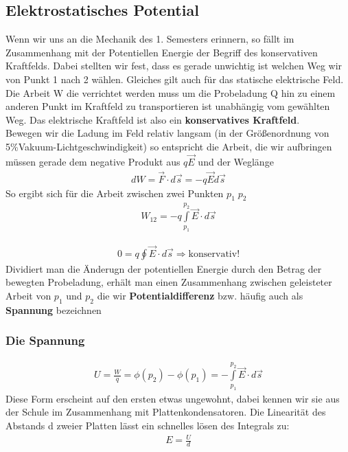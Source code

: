 \subsection{Elektrostatisches Potential} Wenn wir uns an die Mechanik des 1. Semesters erinnern, so fällt im Zusammenhang mit der Potentiellen Energie der Begriff des konservativen Kraftfelds. Dabei stellten wir fest, dass es gerade unwichtig ist welchen Weg wir von Punkt 1 nach 2 wählen. Gleiches gilt auch für das statische elektrische Feld. Die Arbeit W die verrichtet werden muss um die Probeladung Q hin zu einem anderen Punkt im Kraftfeld zu transportieren ist unabhängig vom gewählten Weg. Das elektrische Kraftfeld ist also ein \textbf{konservatives Kraftfeld}. \\ Bewegen wir die Ladung im Feld relativ langsam (in der Größenordnung von 5\%Vakuum-Lichtgeschwindigkeit) so entspricht die Arbeit, die wir aufbringen müssen gerade dem negative Produkt aus $q \vec{E}$ und der Weglänge\begin{align}
dW = \vec{F} \cdot d\vec{s} = - q \vec{E} d\vec{s} \label{eqn:defElArbeit}
\end{align}
So ergibt sich für die Arbeit zwischen zwei Punkten $p_1 \; p_2$\begin{align}
\boxed{ W_{12}	= -q\int \limits_{p_1}^{p_2} \vec{ E} \cdot d\vec{s} }\label{eqn:elArbeit} \end{align}

\begin{align}
0 		= q \oint  \vec{E} \cdot d\vec{s} \Rightarrow \mathrm{konservativ!}
\end{align} Dividiert man die Änderugn der potentiellen Energie durch den Betrag der bewegten Probeladung, erhält man einen Zusammenhang zwischen geleisteter Arbeit von $p_1$ und $p_2$ die wir \textbf{Potentialdifferenz} bzw. häufig auch als \textbf{Spannung} bezeichnen

\subsubsection{Die Spannung}
\begin{align} \label{eqn:defSpannung}
\boxed{U = \frac{W}{q} = \phi\left( p_2\right) - \phi\left( p_1\right) = - \int \limits_{p_1}^{p_2} \vec{ E} \cdot d\vec{s} }
\end{align}Diese Form erscheint auf den ersten etwas ungewohnt, dabei kennen wir sie aus der Schule im Zusammenhang mit Plattenkondensatoren. Die Linearität des Abstands d zweier Platten lässt ein schnelles lösen des Integrals zu:\begin{align*}
E = \frac{U}{d}
\end{align*}
